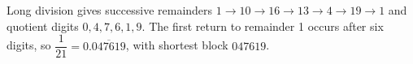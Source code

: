 Long division gives successive remainders $1\to10\to16\to13\to4\to19\to1$ and quotient digits $0,4,7,6,1,9$. The first return to remainder 1 occurs after six digits, so $\dfrac{1}{21}=0.\overline{047619}$, with shortest block $\boxed{047619}$.

